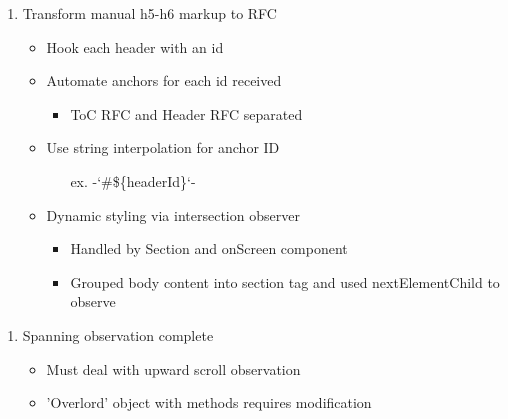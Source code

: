 \documentclass[7px]{article}
\begin{document}
\deploy
{
  \small
  \begin{enumerate}[label=$\multimapinv$]
    \item Transform manual h5-h6 markup to RFC
      \begin{itemize}[label=$\multimapdot$, leftmargin=1.7mm]
        \item Hook each header with an id
        \item Automate anchors for each id received
          \begin{itemize}
            \item ToC RFC and Header RFC separated
          \end{itemize}
        \item Use string interpolation for anchor ID
          \begin{itemize}
            \item[ex.] -`\#\$\{headerId\}`-
          \end{itemize}
        \item Dynamic styling via intersection observer
          \begin{itemize}[label=$\multimapdot$, leftmargin=1.7mm]
            \item Handled by Section and onScreen component
            \item Grouped body content into section tag and used nextElementChild to observe
          \end{itemize}
      \end{itemize}
  \end{enumerate}
  \normalsize
}
{
  \begin{enumerate}
    \item Spanning observation complete
      \begin{itemize}
        \item Must deal with upward scroll observation
        \item 'Overlord' object with methods requires modification
      \end{itemize}
  \end{enumerate}
}

\end{document}
